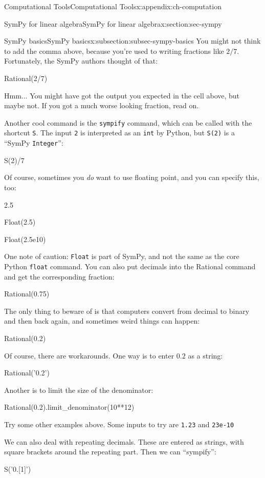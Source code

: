 \documentclass[oneside,10pt,]{book}
\newcommand{\mono}[1]{\texttt{#1}}
\numberwithin{equation}{section}
\begin{document}
\begin{appendixptx}{Computational Tools}{}{Computational Tools}{}{}{x:appendix:ch-computation}
\begin{sectionptx}{SymPy for linear algebra}{}{SymPy for linear algebra}{}{}{x:section:sec-sympy}
\begin{subsectionptx}{SymPy basics}{}{SymPy basics}{}{}{x:subsection:subsec-sympy-basics}
You might not think to add the comma above, because you're used to writing fractions like \(2/7\). Fortunately, the SymPy authors thought of that:%
\begin{sageinput}
Rational(2/7)
\end{sageinput}
Hmm... You might have got the output you expected in the cell above, but maybe not. If you got a much worse looking fraction, read on.%
\par
Another cool command is the \mono{sympify} command, which can be called with the shortcut \mono{S}. The input \mono{2} is interpreted as an \mono{int} by Python, but \mono{S(2)} is a ``SymPy \mono{Integer}'':%
\begin{sageinput}
S(2)/7
\end{sageinput}
Of course, sometimes you \emph{do} want to use floating point, and you can specify this, too:%
\begin{sageinput}
2.5
\end{sageinput}
\begin{sageinput}
Float(2.5)
\end{sageinput}
\begin{sageinput}
Float(2.5e10)
\end{sageinput}
One note of caution: \mono{Float} is part of SymPy, and not the same as the core Python \mono{float} command. You can also put decimals into the Rational command and get the corresponding fraction:%
\begin{sageinput}
Rational(0.75)
\end{sageinput}
The only thing to beware of is that computers convert from decimal to binary and then back again, and sometimes weird things can happen:%
\begin{sageinput}
Rational(0.2)
\end{sageinput}
Of course, there are workarounds. One way is to enter \(0.2\) as a string:%
\begin{sageinput}
Rational('0.2')
\end{sageinput}
Another is to limit the size of the denominator:%
\begin{sageinput}
Rational(0.2).limit_denominator(10**12)
\end{sageinput}
Try some other examples above. Some inputs to try are \mono{1.23} and \mono{23e-10}%
\par
We can also deal with repeating decimals. These are entered as strings, with square brackets around the repeating part. Then we can ``sympify'':%
\begin{sageinput}
S('0.[1]')

\end{sageinput}
\end{subsectionptx}
\end{sectionptx}
\end{appendixptx}
\end{document}
